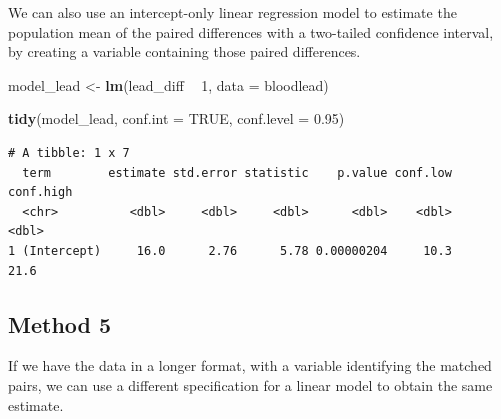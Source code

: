 \documentclass[
]{book}
\newenvironment{Shaded}{\begin{snugshade}}{\end{snugshade}}
\newcommand{\DataTypeTok}[1]{\textcolor[rgb]{0.13,0.29,0.53}{#1}}
\newcommand{\DecValTok}[1]{\textcolor[rgb]{0.00,0.00,0.81}{#1}}
\newcommand{\FloatTok}[1]{\textcolor[rgb]{0.00,0.00,0.81}{#1}}
\newcommand{\KeywordTok}[1]{\textcolor[rgb]{0.13,0.29,0.53}{\textbf{#1}}}
\newcommand{\NormalTok}[1]{#1}
\newcommand{\OperatorTok}[1]{\textcolor[rgb]{0.81,0.36,0.00}{\textbf{#1}}}
\newcommand{\OtherTok}[1]{\textcolor[rgb]{0.56,0.35,0.01}{#1}}
\newcommand{\StringTok}[1]{\textcolor[rgb]{0.31,0.60,0.02}{#1}}
\begin{document}
We can also use an intercept-only linear regression model to estimate the population mean of the paired differences with a two-tailed confidence interval, by creating a variable containing those paired differences.

\begin{Shaded}
\begin{Highlighting}[]
\NormalTok{model_lead <-}\StringTok{ }\KeywordTok{lm}\NormalTok{(lead_diff }\OperatorTok{~}\StringTok{ }\DecValTok{1}\NormalTok{, }\DataTypeTok{data =}\NormalTok{ bloodlead)}

\KeywordTok{tidy}\NormalTok{(model_lead, }\DataTypeTok{conf.int =} \OtherTok{TRUE}\NormalTok{, }\DataTypeTok{conf.level =} \FloatTok{0.95}\NormalTok{)}
\end{Highlighting}
\end{Shaded}

\begin{verbatim}
# A tibble: 1 x 7
  term        estimate std.error statistic    p.value conf.low conf.high
  <chr>          <dbl>     <dbl>     <dbl>      <dbl>    <dbl>     <dbl>
1 (Intercept)     16.0      2.76      5.78 0.00000204     10.3      21.6
\end{verbatim}

\hypertarget{method-5}{%
\subsection{Method 5}\label{method-5}}

If we have the data in a longer format, with a variable identifying the matched pairs, we can use a different specification for a linear model to obtain the same estimate.

\begin{Shaded}
\end{Shaded}
\end{document}
